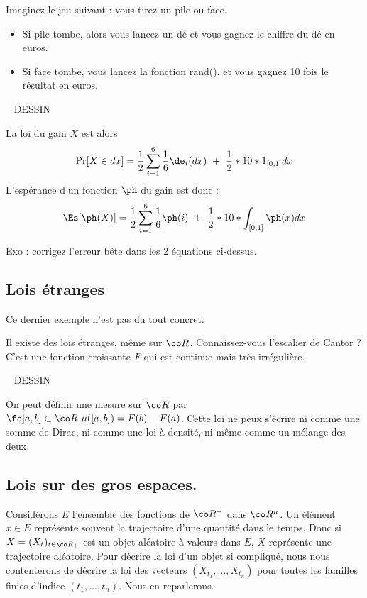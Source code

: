 \documentclass{article}
\def\dessin{\ \linebreak \vspace{0.5cm}  \linebreak  DESSIN  \vspace{1cm} \ \linebreak   }
\begin{document}
Imaginez le jeu suivant : vous tirez un pile ou face. 
\begin{itemize}
\item Si pile tombe, alors vous lancez un dé et vous gagnez le chiffre du dé en euros.  
\item Si face tombe, vous lancez la fonction rand(), et vous gagnez  10 fois le résultat en euros.
\end{itemize}

\dessin


La loi du gain $X$ est alors 
$$
\Pr[X\in dx] =  \frac 12  \sum_{i=1}^6  \frac 1 6  \de_i(dx)  \ + \     \frac  1 2   *   10 *    1_{[0,1]}  dx   
$$
L'espérance d'un fonction $\ph$ du gain est donc : 
$$
\Es[\ph(X)] = \frac 12  \sum_{i=1}^6  \frac 1 6  \ph(i)    \ + \     \frac  1 2  * 10 *     \int_{[0,1]}  \ph(x)  dx
$$

Exo : corrigez l'erreur bête dans les 2 équations ci-dessus. 


\subsection{Lois étranges}

Ce dernier exemple n'est pas du tout concret. 

Il existe des lois étranges, même sur $\co R$. Connaissez-vous l'escalier de Cantor ? C'est une fonction croissante $F$ qui est continue mais très irrégulière. 

\dessin

On peut définir une mesure sur $\co R$ par $\fo ]a,b] \subset \co R \ \mu([a,b]) = F(b) - F(a)$.  Cette loi ne peux s'écrire ni comme une somme de Dirac, ni comme une loi à densité, ni même comme un mélange des deux.  


\subsection{Lois sur des gros espaces.}

Considérons $E$  l'ensemble des fonctions de $\co R^+$ dans $\co R^n$.   Un élément $x\in E$  représente souvent la trajectoire d'une quantité dans le temps. Donc si $X=(X_t)_{t\in \co R_+}$ est un objet aléatoire à valeurs dans $E$,   $X$ représente une trajectoire aléatoire.  Pour décrire la loi d'un objet si compliqué, nous nous contenterons de décrire la loi des vecteurs $(X_{t_1},...,X_{t_n})$ pour toutes les familles finies d'indice $(t_1,...,t_n)$.  Nous en reparlerons. 
  
\end{document}
